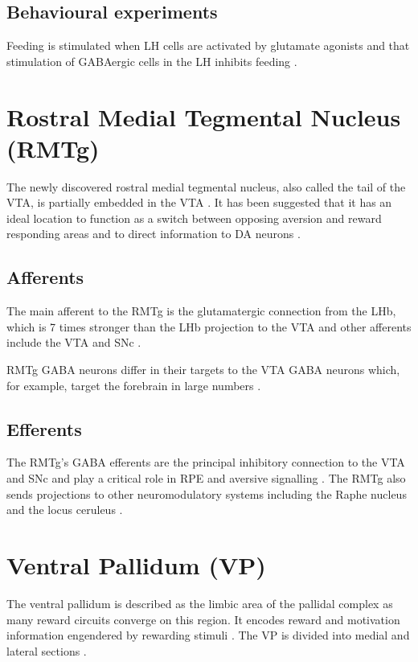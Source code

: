 \documentclass[12pt,a4paper]{article}
\begin{document}
\subsection{Behavioural experiments}
Feeding is stimulated when LH cells are activated by glutamate
agonists \citep{stanley93} and that stimulation of GABAergic cells in
the LH inhibits feeding \citep{Stanley2011}.






\section{Rostral Medial Tegmental Nucleus (RMTg) }
The newly discovered rostral medial tegmental nucleus, also called the
tail of the VTA, is partially embedded in the VTA
\citep{Bourdy2012}. It has been suggested that it has an ideal
location to function as a switch between opposing aversion and reward
responding areas and to direct information to DA neurons
\citep{Barrot2012}.

\subsection{Afferents}
The main afferent to the RMTg is the glutamatergic connection from the
LHb, which is 7 times stronger than the LHb projection to the VTA
\citep{Barrot2012} and other afferents include the VTA and SNc
\citep{Lavezzi2011}.

RMTg GABA neurons differ in their targets to the VTA GABA neurons
which, for example, target the forebrain in large numbers
\citep{Barrot2012}.

\subsection{Efferents}
The RMTg’s GABA efferents are the principal inhibitory connection to
the VTA and SNc and play a critical role in RPE and aversive
signalling \citep{Bourdy2012}. The RMTg also sends projections to
other neuromodulatory systems including the Raphe nucleus and the
locus ceruleus \citep{Barrot2012} \citep{Hong2011}.






\section{Ventral Pallidum (VP)}
The ventral pallidum is described as the limbic area of the pallidal complex as
many reward circuits converge on this region. It encodes reward and motivation
information engendered by rewarding stimuli \citep{Smith2009}. The VP is divided into medial
and lateral sections \citep{Sesack2010}.
\end{document}
